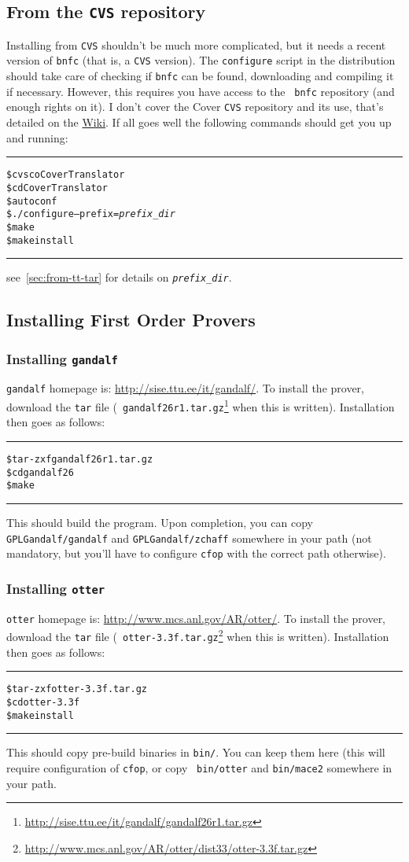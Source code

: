 \documentclass{article}
\newenvironment{shellcode}
  {\begin{alltt}\rule{7cm}{1pt}}
  {\rule{7cm}{1pt}\end{alltt}}
\begin{document}
\subsection{From the {\tt CVS} repository}
Installing from {\tt CVS} shouldn't be much more complicated, but it
needs a recent version of {\tt bnfc} (that is, a {\tt CVS}
version). The {\tt configure} script in the distribution should take
care of checking if {\tt bnfc} can be found, downloading and compiling
it if necessary. However, this requires you have access to the {\tt
bnfc} repository (and enough rights on it). I don't cover the {\sc
Cover} {\tt CVS} repository and its use, that's detailed on the
\href{http://coverproject.org/Wiki/oddmuse.cgi/Cover_CVS_repository}{Wiki}. If
all goes well the following commands should get you up and running:
\begin{shellcode}
\$ {\color{red}cvs co CoverTranslator}
\$ {\color{red}cd CoverTranslator}
\$ {\color{red}autoconf}
\$ {\color{red}./configure --prefix={\color{blue}\textit{prefix\_dir}}}
\$ {\color{red}make}
\$ {\color{red}make install}
\end{shellcode} 
see~\ref{sec:from-tt-tar} for details on {\tt\it\color{blue}prefix\_dir}.

\subsection{Installing First Order Provers}

\subsubsection{Installing {\tt gandalf}}
{\tt gandalf} homepage is: \url{http://sise.ttu.ee/it/gandalf/}. To
install the prover, download the {\tt tar} file ({\tt
gandalf26r1.tar.gz}\footnote{\url{http://sise.ttu.ee/it/gandalf/gandalf26r1.tar.gz}}
when this is written). Installation then goes as follows:
\begin{shellcode}
\$ {\color{red}tar -zxf gandalf26r1.tar.gz}
\$ {\color{red}cd gandalf26}
\$ {\color{red}make}
\end{shellcode} 
This should build the program. Upon completion, you can copy {\tt
GPLGandalf/gandalf} and {\tt GPLGandalf/zchaff} somewhere in your path
(not mandatory, but you'll have to configure {\tt cfop} with the
correct path otherwise).

\subsubsection{Installing {\tt otter}}
{\tt otter} homepage is:
\url{http://www.mcs.anl.gov/AR/otter/}. To install the prover,
download the {\tt tar} file ({\tt
otter-3.3f.tar.gz}\footnote{\url{http://www.mcs.anl.gov/AR/otter/dist33/otter-3.3f.tar.gz}}
when this is written). Installation then goes as follows:
\begin{shellcode}
\$ {\color{red}tar -zxf otter-3.3f.tar.gz}
\$ {\color{red}cd otter-3.3f}
\$ {\color{red}make install}
\end{shellcode} 
This should copy pre-build binaries in {\tt bin/}. You can keep them
here (this will require configuration of {\tt cfop}, or copy {\tt
bin/otter} and {\tt bin/mace2} somewhere in your path.
\end{document}
